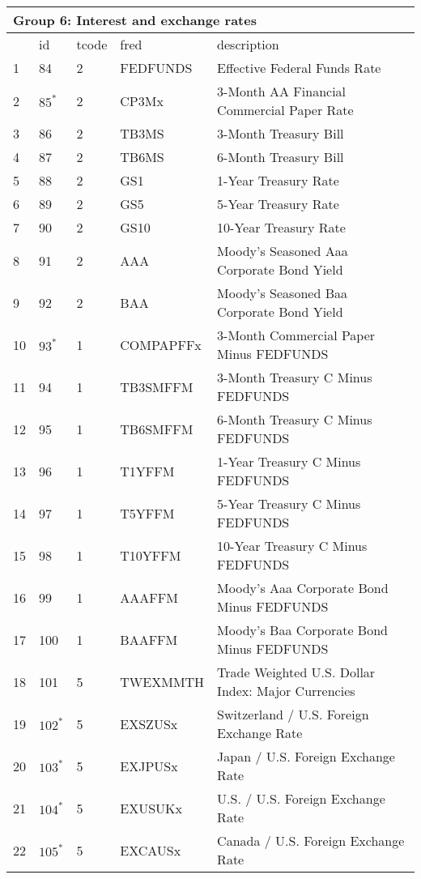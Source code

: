 \begin{table}[ht] 
\centering 
\begin{tabular}{lllll}
\multicolumn{5}{l}{Group 6: Interest and exchange rates} \\
\toprule
 & id & tcode & fred & description \\
\midrule
1 & 84 & 2 & FEDFUNDS & Effective Federal Funds Rate \\
2 & $85^*$ & 2 & CP3Mx & 3-Month AA Financial Commercial Paper Rate \\
3 & 86 & 2 & TB3MS & 3-Month Treasury Bill \\
4 & 87 & 2 & TB6MS & 6-Month Treasury Bill \\
5 & 88 & 2 & GS1 & 1-Year Treasury Rate \\
6 & 89 & 2 & GS5 & 5-Year Treasury Rate \\
7 & 90 & 2 & GS10 & 10-Year Treasury Rate \\
8 & 91 & 2 & AAA & Moody's Seasoned Aaa Corporate Bond Yield \\
9 & 92 & 2 & BAA & Moody's Seasoned Baa Corporate Bond Yield \\
10 & $93^*$ & 1 & COMPAPFFx & 3-Month Commercial Paper Minus FEDFUNDS \\
11 & 94 & 1 & TB3SMFFM & 3-Month Treasury C Minus FEDFUNDS \\
12 & 95 & 1 & TB6SMFFM & 6-Month Treasury C Minus FEDFUNDS \\
13 & 96 & 1 & T1YFFM & 1-Year Treasury C Minus FEDFUNDS \\
14 & 97 & 1 & T5YFFM & 5-Year Treasury C Minus FEDFUNDS \\
15 & 98 & 1 & T10YFFM & 10-Year Treasury C Minus FEDFUNDS \\
16 & 99 & 1 & AAAFFM & Moody's Aaa Corporate Bond Minus FEDFUNDS \\
17 & 100 & 1 & BAAFFM & Moody's Baa Corporate Bond Minus FEDFUNDS \\
\rowcolor{Maroon} 18 & 101 & 5 & TWEXMMTH & Trade Weighted U.S. Dollar Index: Major Currencies \\
19 & $102^*$ & 5 & EXSZUSx & Switzerland / U.S. Foreign Exchange Rate \\
20 & $103^*$ & 5 & EXJPUSx & Japan / U.S. Foreign Exchange Rate \\
21 & $104^*$ & 5 & EXUSUKx & U.S. / U.S. Foreign Exchange Rate \\
22 & $105^*$ & 5 & EXCAUSx & Canada / U.S. Foreign Exchange Rate \\
\bottomrule
\end{tabular}  
\end{table} 